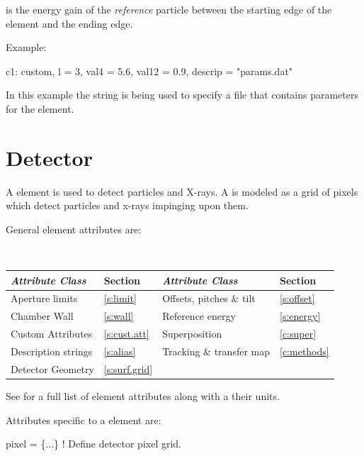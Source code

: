  is the energy gain of the {\it reference} particle
between the starting edge of the element and the ending edge.

Example:
\begin{example}
  c1: custom, l = 3, val4 = 5.6, val12 = 0.9, descrip = "params.dat"
\end{example}
In this example the  string is being used to specify a
file that contains parameters for the element.

\newpage

\section{Detector}
\label{s:detector}

A  element is used to detect particles and X-rays.  A
 is modeled as a grid of pixels which detect particles and x-rays
impinging upon them.

General  element attributes are:
\begin{center}
\tt 
\begin{tabular}{llll} \toprule
  {\sl Attribute Class}      & Section           & {\sl Attribute Class}      & Section         \\ \midrule
  Aperture limits            & \ref{s:limit}     & Offsets, pitches \& tilt   & \ref{s:offset}  \\
  Chamber Wall               & \ref{s:wall}      & Reference energy           & \ref{s:energy}  \\
  Custom Attributes          & \ref{s:cust.att}  & Superposition              & \ref{c:super}   \\
  Description strings        & \ref{s:alias}     & Tracking \& transfer map   & \ref{c:methods} \\
  Detector Geometry          & \ref{s:surf.grid} &                            &                 \\
  \bottomrule
\end{tabular}
\end{center}
\toffset
See  for a full list of element attributes along with a their units.

Attributes specific to a  element are:
\begin{example}
  pixel         = \{...\}   ! Define detector pixel grid.
\end{example}


